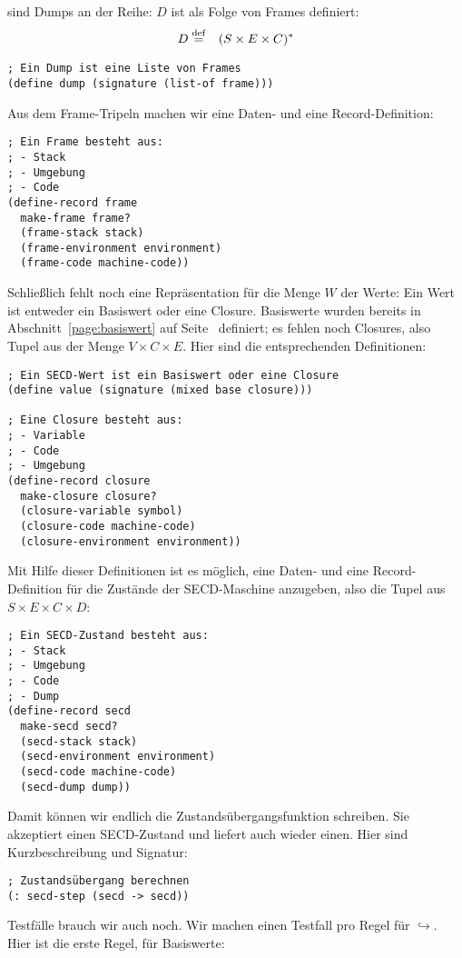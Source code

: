 sind Dumps an der Reihe: $D$ ist als Folge von Frames definiert:
%
\begin{eqnarray*}
  D &\stackrel{\rm def}{=}& (S\times E \times C)^\ast
\end{eqnarray*}
%
\begin{lstlisting}
; Ein Dump ist eine Liste von Frames
(define dump (signature (list-of frame)))
\end{lstlisting}
%
Aus dem Frame-Tripeln machen wir eine Daten- und eine Record-Definition:
%
\begin{lstlisting}
; Ein Frame besteht aus:
; - Stack
; - Umgebung
; - Code
(define-record frame
  make-frame frame?
  (frame-stack stack)
  (frame-environment environment)
  (frame-code machine-code))
\end{lstlisting}
%
Schließlich fehlt noch eine Repräsentation für die Menge $W$ der
Werte: Ein Wert ist entweder ein Basiswert oder eine Closure.
Basiswerte wurden bereits in Abschnitt~\ref{page:basiswert} auf
Seite~\pageref{page:basiswert} definiert; es fehlen noch
Closures, also Tupel aus der Menge $V\times C\times E$.  Hier sind die
entsprechenden Definitionen:
%
\begin{lstlisting}
; Ein SECD-Wert ist ein Basiswert oder eine Closure
(define value (signature (mixed base closure)))

; Eine Closure besteht aus:
; - Variable
; - Code
; - Umgebung
(define-record closure
  make-closure closure?
  (closure-variable symbol)
  (closure-code machine-code)
  (closure-environment environment))
\end{lstlisting}
%
Mit Hilfe dieser Definitionen ist es möglich, eine Daten- und eine
Record-Definition für die Zustände der SECD-Maschine anzugeben, also
die Tupel aus $S\times E\times C\times D$:
%
\begin{lstlisting}
; Ein SECD-Zustand besteht aus:
; - Stack
; - Umgebung
; - Code
; - Dump
(define-record secd
  make-secd secd?
  (secd-stack stack)
  (secd-environment environment)
  (secd-code machine-code)
  (secd-dump dump))
\end{lstlisting}
%
Damit können wir endlich die Zustandsübergangsfunktion schreiben.  Sie
akzeptiert einen SECD-Zustand und liefert auch wieder einen.  Hier
sind Kurzbeschreibung und Signatur:
%
\begin{lstlisting}
; Zustandsübergang berechnen
(: secd-step (secd -> secd))
\end{lstlisting}
%
Testfälle brauch wir auch noch.  Wir machen einen Testfall pro Regel
für $\hookrightarrow$.  Hier ist die erste Regel, für Basiswerte:
